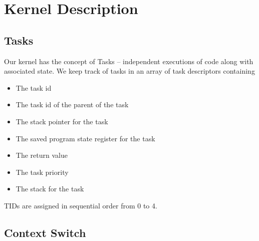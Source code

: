 \documentclass{article}
\begin{document}
\section{Kernel Description}

\subsection{Tasks}

Our kernel has the concept of Tasks -- independent executions of code along with associated state. We keep track of tasks in an array of task descriptors containing

\begin{itemize}
  \item The task id
  \item The task id of the parent of the task
  \item The stack pointer for the task
  \item The saved program state register for the task
  \item The return value
  \item The task priority
  \item The stack for the task
\end{itemize}

TIDs are assigned in sequential order from 0 to 4.

\subsection{Context Switch}
\end{document}

